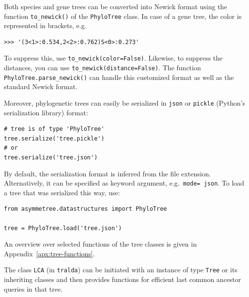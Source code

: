 \documentclass[hidelinks,11pt]{article}
\newcommand{\sq}{\textquotesingle}
\begin{document}
Both species and gene trees can be converted into Newick format using the function \texttt{to\_newick()} of the \texttt{PhyloTree} class.
In case of a gene tree, the color is represented in brackets, e.g.

\begin{adjustwidth}{1cm}{1cm}\vspace{2mm}
\begin{verbatim}
>>> '(3<1>:0.534,2<2>:0.762)S<0>:0.273'
\end{verbatim}
\end{adjustwidth}

\noindent
To suppress this, use \texttt{to\_newick(color=False)}. Likewise, to suppress the distances, you can use \texttt{to\_newick(distance=False)}.
The function \texttt{PhyloTree.parse\_newick()} can handle this customized format as well as the standard Newick format.

Moreover, phylogenetic trees can easily be serialized in \texttt{json} or \texttt{pickle} (Python's serialization library) format:

\begin{adjustwidth}{1cm}{1cm}\vspace{2mm}
\begin{verbatim}
# tree is of type 'PhyloTree'
tree.serialize('tree.pickle')
# or
tree.serialize('tree.json')
\end{verbatim}
\end{adjustwidth}

\noindent
By default, the serialization format is inferred from the file extension.
Alternatively, it can be specified as keyword argument, e.g.\ \texttt{mode=\sq
json\sq}.
To load a tree that was serialized this way, use:

\begin{adjustwidth}{1cm}{1cm}\vspace{2mm}
\begin{verbatim}
from asymmetree.datastructures import PhyloTree

tree = PhyloTree.load('tree.json')
\end{verbatim}
\end{adjustwidth}

An overview over selected functions of the tree classes is given in 
Appendix~\ref{apx:tree-functions}.

The class \texttt{LCA} (in \texttt{tralda}) can be initiated with an instance 
of type \texttt{Tree} 
or its inheriting classes and then provides functions for efficient last common 
ancestor queries in that tree. 
\end{document}
